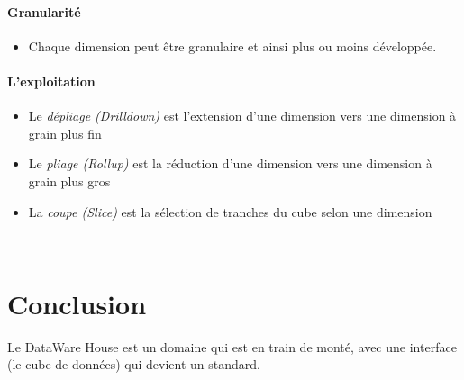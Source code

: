 \documentclass[a4paper,11pt]{article}
\begin{document}
		\paragraph{Granularité}
			\begin{itemize}
				\item Chaque dimension peut être granulaire et ainsi plus ou moins développée.
			\end{itemize}
		
		\paragraph{L'exploitation}
			\begin{itemize}
				\item Le \emph{dépliage (Drilldown)} est l'extension d'une dimension vers une dimension à grain plus fin
				\item Le \emph{pliage (Rollup)} est la réduction d'une dimension vers une dimension à grain plus gros
				\item La \emph{coupe (Slice)} est la sélection de tranches du cube selon une dimension
				\end{itemize}
				~\\
				
		\section{Conclusion}
		
		Le DataWare House est un domaine qui est en train de monté, avec une interface (le cube de données) qui devient un standard.
				
				
		
\end{document}
